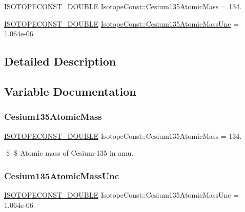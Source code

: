 \begin{DoxyCompactItemize}
\item 
\mbox{\hyperlink{group___isotope_const-_macros_ga8f45a7272ce02c0b4c65c44636ed719a}{I\+S\+O\+T\+O\+P\+E\+C\+O\+N\+S\+T\+\_\+\+D\+O\+U\+B\+LE}} \mbox{\hyperlink{group___isotope_const-_cesium-_cs135_ga3163ca57f080b18b516184bf793d5895}{Isotope\+Const\+::\+Cesium135\+Atomic\+Mass}} = 134.
\item 
\mbox{\hyperlink{group___isotope_const-_macros_ga8f45a7272ce02c0b4c65c44636ed719a}{I\+S\+O\+T\+O\+P\+E\+C\+O\+N\+S\+T\+\_\+\+D\+O\+U\+B\+LE}} \mbox{\hyperlink{group___isotope_const-_cesium-_cs135_ga6eebd673db7641587760779f56df3d0c}{Isotope\+Const\+::\+Cesium135\+Atomic\+Mass\+Unc}} = 1.\+064e-\/06
\end{DoxyCompactItemize}


\subsection{Detailed Description}


\subsection{Variable Documentation}
\mbox{\label{group___isotope_const-_cesium-_cs135_ga3163ca57f080b18b516184bf793d5895}} 
\subsubsection{\texorpdfstring{Cesium135\+Atomic\+Mass}{Cesium135AtomicMass}}
{\footnotesize\ttfamily \mbox{\hyperlink{group___isotope_const-_macros_ga8f45a7272ce02c0b4c65c44636ed719a}{I\+S\+O\+T\+O\+P\+E\+C\+O\+N\+S\+T\+\_\+\+D\+O\+U\+B\+LE}} Isotope\+Const\+::\+Cesium135\+Atomic\+Mass = 134.}

\$ \$ Atomic mass of Cesium-\/135 in amu. \mbox{\label{group___isotope_const-_cesium-_cs135_ga6eebd673db7641587760779f56df3d0c}} 
\subsubsection{\texorpdfstring{Cesium135\+Atomic\+Mass\+Unc}{Cesium135AtomicMassUnc}}
{\footnotesize\ttfamily \mbox{\hyperlink{group___isotope_const-_macros_ga8f45a7272ce02c0b4c65c44636ed719a}{I\+S\+O\+T\+O\+P\+E\+C\+O\+N\+S\+T\+\_\+\+D\+O\+U\+B\+LE}} Isotope\+Const\+::\+Cesium135\+Atomic\+Mass\+Unc = 1.\+064e-\/06}


